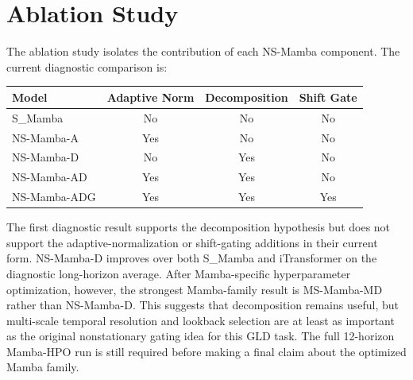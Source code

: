 \section{Ablation Study}

The ablation study isolates the contribution of each NS-Mamba component.
The current diagnostic comparison is:
\begin{center}
\begin{tabular}{lccc}
\toprule
Model & Adaptive Norm & Decomposition & Shift Gate \\
\midrule
S\_Mamba & No & No & No \\
NS-Mamba-A & Yes & No & No \\
NS-Mamba-D & No & Yes & No \\
NS-Mamba-AD & Yes & Yes & No \\
NS-Mamba-ADG & Yes & Yes & Yes \\
\bottomrule
\end{tabular}
\end{center}

The first diagnostic result supports the decomposition hypothesis but does not support the adaptive-normalization or shift-gating additions in their current form.
NS-Mamba-D improves over both S\_Mamba and iTransformer on the diagnostic long-horizon average.
After Mamba-specific hyperparameter optimization, however, the strongest Mamba-family result is MS-Mamba-MD rather than NS-Mamba-D.
This suggests that decomposition remains useful, but multi-scale temporal resolution and lookback selection are at least as important as the original nonstationary gating idea for this GLD task.
The full 12-horizon Mamba-HPO run is still required before making a final claim about the optimized Mamba family.
